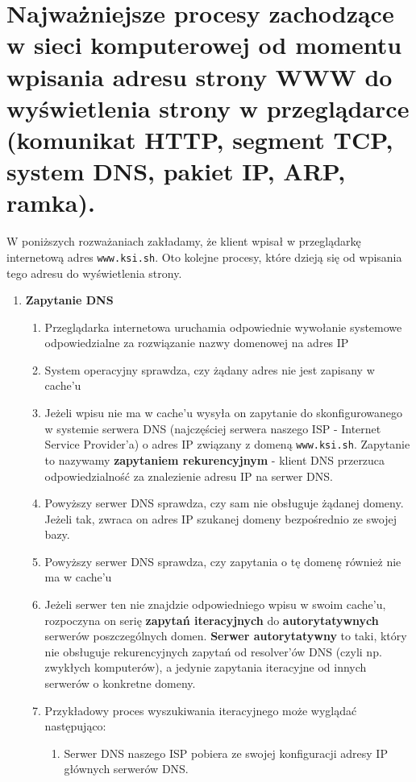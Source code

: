 \documentclass[main.tex]{subfiles}
\begin{document}
    \section{Najważniejsze procesy zachodzące w sieci komputerowej od momentu wpisania adresu strony WWW do wyświetlenia strony w przeglądarce (komunikat HTTP, segment TCP, system DNS, pakiet IP, ARP, ramka).}
    W poniższych rozważaniach zakładamy, że klient wpisał w przeglądarkę internetową adres \texttt{www.ksi.sh}.
    Oto kolejne procesy, które dzieją się od wpisania tego adresu do wyświetlenia strony.
    \begin{enumerate}
        \item \textbf{Zapytanie DNS}
        \begin{enumerate}
            \item Przeglądarka internetowa uruchamia odpowiednie wywołanie systemowe odpowiedzialne za rozwiązanie nazwy domenowej na adres IP
            \item System operacyjny sprawdza, czy żądany adres nie jest zapisany w cache'u
            \item Jeżeli wpisu nie ma w cache'u wysyła on zapytanie do skonfigurowanego w systemie serwera DNS (najczęściej serwera naszego ISP - Internet Service Provider'a) o adres IP związany z domeną \texttt{www.ksi.sh}.
            Zapytanie to nazywamy \textbf{zapytaniem rekurencyjnym} - klient DNS przerzuca odpowiedzialność za znalezienie adresu IP na serwer DNS.
            \item Powyższy serwer DNS sprawdza, czy sam nie obsługuje żądanej domeny. Jeżeli tak, zwraca on adres IP szukanej domeny bezpośrednio ze swojej bazy.
            \item Powyższy serwer DNS sprawdza, czy zapytania o tę domenę również nie ma w cache'u
            \item Jeżeli serwer ten nie znajdzie odpowiedniego wpisu w swoim cache'u, rozpoczyna on serię \textbf{zapytań iteracyjnych} do \textbf{autorytatywnych} serwerów poszczególnych domen.
            \textbf{Serwer autorytatywny} to taki, który nie obsługuje rekurencyjnych zapytań od resolver'ów DNS (czyli np. zwykłych komputerów), a jedynie zapytania iteracyjne od innych serwerów o konkretne domeny.
            \item Przykładowy proces wyszukiwania iteracyjnego może wyglądać następująco:
            \begin{enumerate}
                \item Serwer DNS naszego ISP pobiera ze swojej konfiguracji adresy IP głównych serwerów DNS.

\end{enumerate}
\end{enumerate}
\end{enumerate}
\end{document}
